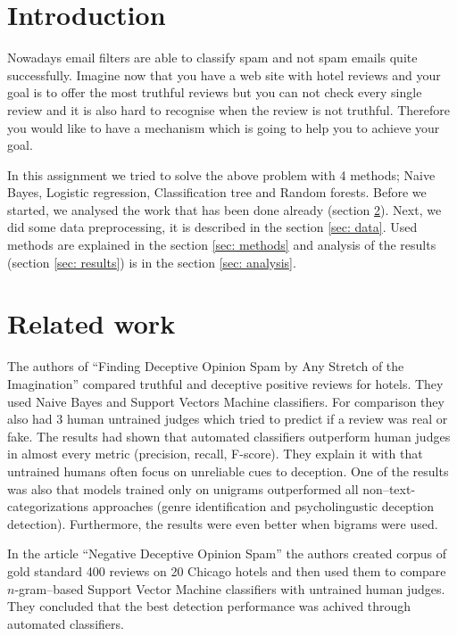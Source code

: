 \documentclass[a4paper,11pt]{article}
\begin{document}
\newpage

\section{Introduction}
Nowadays email filters are able to classify spam and not spam emails quite successfully. Imagine now that you have a web site with hotel reviews and your goal is to offer the most truthful reviews but you can not check every single review and it is also hard to recognise when the review is not truthful. Therefore you would like to have a mechanism which is going to help you to achieve your goal. 

In this assignment we tried to solve the above problem with 4 methods; Naive Bayes, Logistic regression, Classification tree and Random forests. Before we started, we analysed the work that has been done already (section \ref{sec: relatedwork}). Next, we did some data preprocessing, it is described in the section \ref{sec: data}. Used methods are explained in the section \ref{sec: methods} and analysis of the results (section \ref{sec: results}) is in the section \ref{sec: analysis}.

\section{Related work}
\label{sec: relatedwork}
The authors of “Finding Deceptive Opinion Spam by Any Stretch of the Imagination” \cite{article1} compared truthful and deceptive positive reviews for hotels. They used Naive Bayes and Support Vectors Machine classifiers. For comparison they also had 3 human untrained judges which tried to predict if a review was real or fake.  The results had shown that automated classifiers outperform human judges in almost every metric (precision, recall, F-score). They explain it with that untrained humans often focus on unreliable cues to deception. One of the results was also that models trained only on unigrams outperformed all non--text-categorizations approaches (genre identification and psycholingustic deception detection). Furthermore, the results were even better when bigrams were used.

In the article “Negative Deceptive Opinion Spam” \cite{article2} the authors created corpus of gold standard 400 reviews on 20 Chicago hotels and then used them to compare $n$-gram--based Support Vector Machine classifiers with untrained human judges. They concluded that the best detection performance was achived through automated classifiers. 
\end{document}
